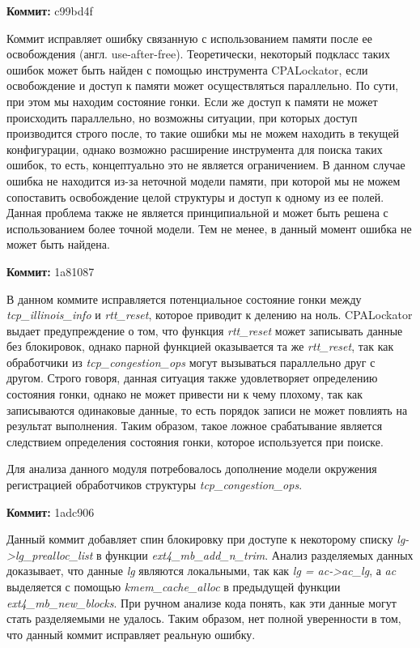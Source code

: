 \vspace{1cm}

\textbf{Коммит:} c99bd4f

Коммит исправляет ошибку связанную с использованием памяти после ее освобождения (англ. use-after-free).
Теоретически, некоторый подкласс таких ошибок может быть найден с помощью инструмента CPALockator, если освобождение и доступ к памяти может осуществляться параллельно.
По сути, при этом мы находим состояние гонки. 
Если же доступ к памяти не может происходить параллельно, но возможны ситуации, при которых доступ производится строго после, то такие ошибки мы не можем находить в текущей конфигурации, однако возможно расширение инструмента для поиска таких ошибок, то есть, концептуально это не является ограничением.
В данном случае ошибка не находится из-за неточной модели памяти, при которой мы не можем сопоставить освобождение целой структуры и доступ к одному из ее полей.
Данная проблема также не является принципиальной и может быть решена с использованием более точной модели.
Тем не менее, в данный момент ошибка не может быть найдена.

\vspace{1cm}

\textbf{Коммит:} 1a81087

В данном коммите исправляется потенциальное состояние гонки между \textit{tcp\_illinois\_info} и \textit{rtt\_reset}, которое приводит к делению на ноль.
CPALockator выдает предупреждение о том, что функция \textit{rtt\_reset} может записывать данные без блокировок, однако парной функцией оказывается та же \textit{rtt\_reset}, так как обработчики из \textit{tcp\_congestion\_ops} могут вызываться параллельно друг с другом.
Строго говоря, данная ситуация также удовлетворяет определению состояния гонки, однако не может привести ни к чему плохому, так как записываются одинаковые данные, то есть порядок записи не может повлиять на результат выполнения.
Таким образом, такое ложное срабатывание является следствием определения состояния гонки, которое используется при поиске. 

Для анализа данного модуля потребовалось дополнение модели окружения регистрацией обработчиков структуры \textit{tcp\_congestion\_ops}.

\vspace{1cm}

\textbf{Коммит:} 1adc906

Данный коммит добавляет спин блокировку при доступе к некоторому списку \textit{lg->lg\_prealloc\_list} в функции \textit{ext4\_mb\_add\_n\_trim}.
Анализ разделяемых данных доказывает, что данные \textit{lg} являются локальными, так как \textit{lg = ac->ac\_lg}, а \textit{ac} выделяется с помощью \textit{kmem\_cache\_alloc} в предыдущей функции \textit{ext4\_mb\_new\_blocks}. 
При ручном анализе кода понять, как эти данные могут стать разделяемыми не удалось.
Таким образом, нет полной уверенности в том, что данный коммит исправляет реальную ошибку.

